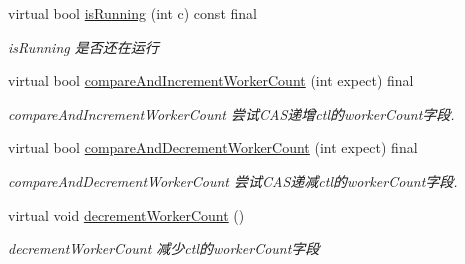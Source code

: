 \begin{DoxyCompactItemize}
virtual bool \hyperlink{classThreadPoolExecutor_a841ae2189d6f85b9df9f69dec5375341}{is\+Running} (int c) const final
\begin{DoxyCompactList}\small\item\em is\+Running 是否还在运行 \end{DoxyCompactList}\item 
virtual bool \hyperlink{classThreadPoolExecutor_ac1bcafe65f800aeb9feade5f31b64fde}{compare\+And\+Increment\+Worker\+Count} (int expect) final
\begin{DoxyCompactList}\small\item\em compare\+And\+Increment\+Worker\+Count 尝试\+C\+A\+S递增ctl的worker\+Count字段. \end{DoxyCompactList}\item 
virtual bool \hyperlink{classThreadPoolExecutor_ac40053b88cd669526a0a6225b5e1a86e}{compare\+And\+Decrement\+Worker\+Count} (int expect) final
\begin{DoxyCompactList}\small\item\em compare\+And\+Decrement\+Worker\+Count 尝试\+C\+A\+S递减ctl的worker\+Count字段. \end{DoxyCompactList}\item 
\mbox{\label{classThreadPoolExecutor_ab19dcfa8af5864274e66bccf40255484}} 
virtual void \hyperlink{classThreadPoolExecutor_ab19dcfa8af5864274e66bccf40255484}{decrement\+Worker\+Count} ()
\begin{DoxyCompactList}\small\item\em decrement\+Worker\+Count 减少ctl的worker\+Count字段 \end{DoxyCompactList}\end{DoxyCompactItemize}
